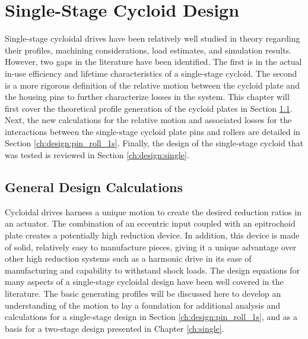 
\chapter{Single-Stage Cycloid Design}\label{ch:design_1s}

Single-stage cycloidal drives have been relatively well studied in theory regarding their profiles, machining considerations, load estimates, and simulation results. However, two gaps in the literature have been identified. The first is in the actual in-use efficiency and lifetime characteristics of a single-stage cycloid. The second is a more rigorous definition of the relative motion between the cycloid plate and the housing pins to further characterize losses in the system. This chapter will first cover the theoretical profile generation of the cycloid plates in Section \ref{ch:design:basic_calc}. Next, the new calculations for the relative motion and associated losses for the interactions between the single-stage cycloid plate pins and rollers are detailed in Section \ref{ch:design:pin_roll_1s}. Finally, the design of the single-stage cycloid that was tested is reviewed in Section \ref{ch:design:single}.

\section{General Design Calculations} \label{ch:design:basic_calc}

Cycloidal drives harness a unique motion to create the desired reduction ratios in an actuator. The combination of an eccentric input coupled with an epitrochoid plate creates a potentially high reduction device. In addition, this device is made of solid, relatively easy to manufacture pieces, giving it a unique advantage over other high reduction systems such as a harmonic drive in its ease of manufacturing and capability to withstand shock loads. The design equations for many aspects of a single-stage cycloidal design have been well covered in the literature. The basic generating profiles will be discussed here to develop an understanding of the motion to lay a foundation for additional analysis and calculations for a single-stage design in Section \ref{ch:design:pin_roll_1s}, and as a basis for a two-stage design presented in Chapter \ref{ch:single}. 

